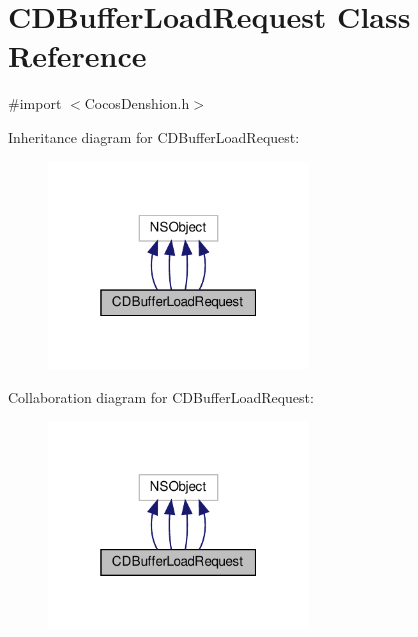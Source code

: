 \hypertarget{interfaceCDBufferLoadRequest}{}\section{C\+D\+Buffer\+Load\+Request Class Reference}
\label{interfaceCDBufferLoadRequest}


{\ttfamily \#import $<$Cocos\+Denshion.\+h$>$}



Inheritance diagram for C\+D\+Buffer\+Load\+Request\+:
\nopagebreak
\begin{figure}[H]
\begin{center}
\leavevmode
\includegraphics[width=196pt]{interfaceCDBufferLoadRequest__inherit__graph}
\end{center}
\end{figure}


Collaboration diagram for C\+D\+Buffer\+Load\+Request\+:
\nopagebreak
\begin{figure}[H]
\begin{center}
\leavevmode
\includegraphics[width=196pt]{interfaceCDBufferLoadRequest__coll__graph}
\end{center}
\end{figure}
